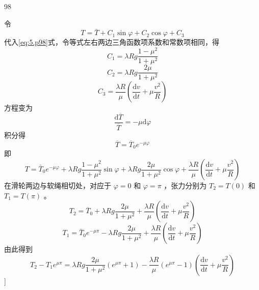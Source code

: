 \begin{solution}{98}
\begin{subsolution}
        令
        \begin{equation*}
            T = \bar {T} + C _ {1} \sin \varphi + C _ {2} \cos \varphi + C _ {3}
        \end{equation*}
        代入\eqref{eq:5.p98}式，令等式左右两边三角函数项系数和常数项相同，得
        \begin{equation*}
            C _ {1} = \lambda R g \frac {1 - \mu^ {2}}{1 + \mu^ {2}}
        \end{equation*}
        \begin{equation*}
            C _ {2} = \lambda R g \frac {2 \mu}{1 + \mu^ {2}}
        \end{equation*}
        \begin{equation*}
            C _ {3} = \frac {\lambda R}{\mu} \left(\frac {\mathrm{d} v}{\mathrm{d} t} + \mu \frac {v ^ {2}}{R}\right)
        \end{equation*}
        方程变为
        \begin{equation*}
            \frac {\mathrm{d} \overline {{T}}}{\overline {{T}}} = - \mu \mathrm{d} \varphi
        \end{equation*}
        积分得
        \begin{equation*}
            \overline {{T}} = \overline {{T}} _ {0} e ^ {- \mu \varphi}
        \end{equation*}
        即
        \begin{equation*}
            T = \bar {T} _ {0} e ^ {- \mu \varphi} + \lambda R g \frac {1 - \mu^ {2}}{1 + \mu^ {2}} \sin \varphi + \lambda R g \frac {2 \mu}{1 + \mu^ {2}} \cos \varphi + \frac {\lambda R}{\mu} \left(\frac {\mathrm{d} v}{\mathrm{d} t} + \mu \frac {v ^ {2}}{R}\right)
        \end{equation*}
        在滑轮两边与软绳相切处，对应于 $\varphi = 0$ 和 $\varphi = \pi$ ，张力分别为 $T_{2} = T(0)$ 和 $T_{1} = T(\pi)$ 。
        \begin{equation*}
            T _ {2} = \overline {{T}} _ {0} + \lambda R g \frac {2 \mu}{1 + \mu^ {2}} + \frac {\lambda R}{\mu} \left(\frac {\mathrm{d} v}{\mathrm{d} t} + \mu \frac {v ^ {2}}{R}\right)
        \end{equation*}
        \begin{equation*}
            T _ {1} = \bar {T} _ {0} e ^ {- \mu \pi} - \lambda R g \frac {2 \mu}{1 + \mu^ {2}} + \frac {\lambda R}{\mu} \left(\frac {\mathrm{d} v}{\mathrm{d} t} + \mu \frac {v ^ {2}}{R}\right)
        \end{equation*}
        由此得到
        \begin{equation*}
            T _ {2} - T _ {1} e ^ {\mu \pi} = \lambda R g \frac {2 \mu}{1 + \mu^ {2}} (e ^ {\mu \pi} + 1) - \frac {\lambda R}{\mu} (e ^ {\mu \pi} - 1) (\frac {\mathrm{d} v}{\mathrm{d} t} + \mu \frac {v ^ {2}}{R})
        \end{equation*}
        ]


\end{subsolution}
\end{solution}
